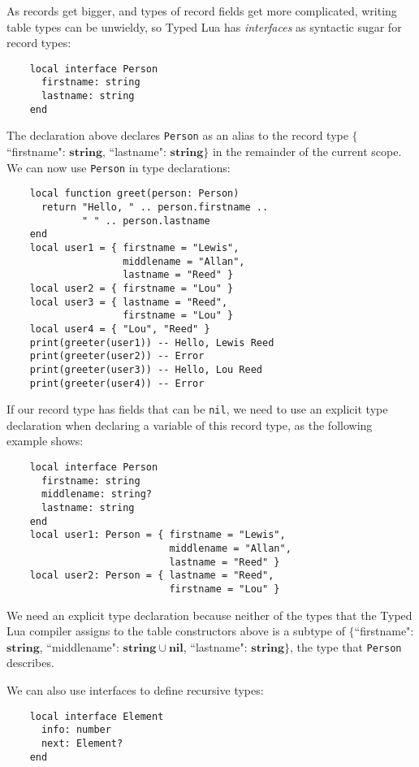 \documentclass[preprint]{sig-alternate}
\newcommand{\Nil}{\mathbf{nil}}
\newcommand{\String}{\mathbf{string}}
\begin{document}
As records get bigger, and types of record fields get more
complicated, writing table types can be unwieldy, so Typed
Lua has {\em interfaces} as syntactic sugar for record types:

\begin{verbatim}
    local interface Person
      firstname: string
      lastname: string
    end
\end{verbatim}

The declaration above declares {\tt Person} as an alias to
the record type $\{$``firstname": $\String$,
 ``lastname": $\String\}$ in
the remainder of the current scope. We can now use {\tt Person} in
type declarations:

\begin{verbatim}
    local function greet(person: Person)
      return "Hello, " .. person.firstname ..
             " " .. person.lastname
    end
    local user1 = { firstname = "Lewis",
                    middlename = "Allan",
                    lastname = "Reed" }
    local user2 = { firstname = "Lou" }
    local user3 = { lastname = "Reed",
                    firstname = "Lou" }
    local user4 = { "Lou", "Reed" }
    print(greeter(user1)) -- Hello, Lewis Reed
    print(greeter(user2)) -- Error
    print(greeter(user3)) -- Hello, Lou Reed
    print(greeter(user4)) -- Error
\end{verbatim}

If our record type has fields that can be {\tt nil}, we need
to use an explicit type declaration when declaring a
variable of this record type, as the following example shows:

\begin{verbatim}
    local interface Person
      firstname: string
      middlename: string?
      lastname: string
    end
    local user1: Person = { firstname = "Lewis",
                            middlename = "Allan",
                            lastname = "Reed" }
    local user2: Person = { lastname = "Reed",
                            firstname = "Lou" }
\end{verbatim}

We need an explicit type declaration because neither of
the types that the Typed Lua compiler assigns to the
table constructors above is a subtype of $\{$``firstname":
$\String$, ``middlename": $\String \cup \Nil$, ``lastname":
$\String\}$, the type that {\tt Person} describes.

We can also use interfaces to define recursive types:

\begin{verbatim}
    local interface Element
      info: number
      next: Element?
    end
\end{verbatim}
\end{document}
